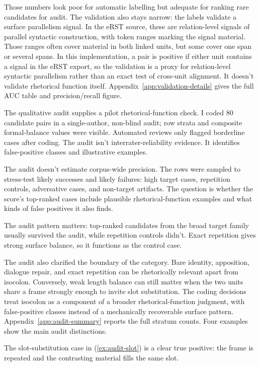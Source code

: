 \documentclass[12pt]{article}
\begin{document}
Those numbers look poor for automatic labelling but adequate for ranking
rare candidates for audit. The validation also stays narrow: the
 labels validate a surface parallelism signal. In the
eRST source, these are relation-level signals of
parallel syntactic construction, with token ranges marking the signal
material. Those ranges often cover material in both linked units, but some
cover one span or several spans. In this implementation, a pair is
positive if either unit contains a  signal in the eRST
export, so the validation is a proxy for relation-level syntactic
parallelism rather than an exact test of cross-unit alignment. It doesn't
validate rhetorical function itself.
Appendix~\ref{app:validation-details} gives the full AUC table and
precision/recall figure.

The qualitative audit supplies a pilot rhetorical-function check. I coded
80 candidate pairs in a single-author, non-blind audit; row strata and
composite formal-balance values were visible. Automated reviews only
flagged borderline cases after coding. The audit isn't
interrater-reliability evidence. It identifies false-positive classes and
illustrative examples.

The audit doesn't estimate corpus-wide precision. The rows
were sampled to stress-test likely successes and likely failures: high
target cases, repetition controls, adversative cases, and non-target
artifacts. The question is whether the score's top-ranked cases include
plausible rhetorical-function examples and what kinds of false positives it
also finds.

The audit pattern matters: top-ranked candidates from the broad target family usually survived
the audit, while repetition controls didn't. Exact repetition gives
strong surface balance, so it functions as the control case.

The audit also clarified the boundary of the category. Bare identity,
apposition, dialogue repair, and exact repetition can be rhetorically
relevant apart from isocolon. Conversely, weak length balance can
still matter when the two units share a frame strongly enough to invite
slot substitution. The coding decisions treat isocolon as a
component of a broader rhetorical-function judgment, with false-positive
classes instead of a mechanically recoverable surface pattern.
Appendix~\ref{app:audit-summary} reports the full stratum counts. Four
examples show the main audit distinctions.

The slot-substitution case in (\ref{ex:audit-slot}) is a clear true
positive: the frame is repeated and the contrasting material fills the
same slot.
\ea\label{ex:audit-slot}
\ea {}
\ex {}
\z
\z
\end{document}
